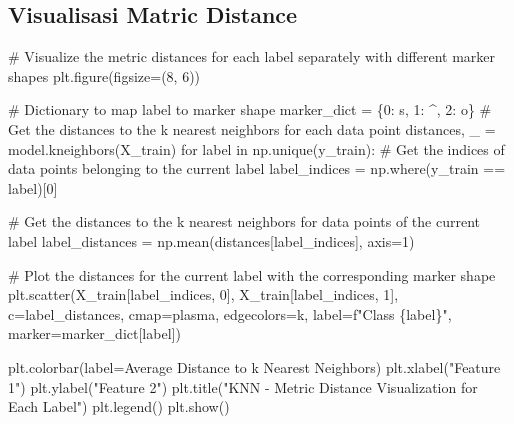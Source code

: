 \documentclass[
  letterpaper,
  DIV=11,
  numbers=noendperiod]{scrreprt}
\newenvironment{Shaded}{\begin{snugshade}}{\end{snugshade}}
\newcommand{\CommentTok}[1]{\textcolor[rgb]{0.37,0.37,0.37}{#1}}
\newcommand{\ControlFlowTok}[1]{\textcolor[rgb]{0.00,0.23,0.31}{#1}}
\newcommand{\DecValTok}[1]{\textcolor[rgb]{0.68,0.00,0.00}{#1}}
\newcommand{\KeywordTok}[1]{\textcolor[rgb]{0.00,0.23,0.31}{#1}}
\newcommand{\NormalTok}[1]{\textcolor[rgb]{0.00,0.23,0.31}{#1}}
\newcommand{\OperatorTok}[1]{\textcolor[rgb]{0.37,0.37,0.37}{#1}}
\newcommand{\SpecialCharTok}[1]{\textcolor[rgb]{0.37,0.37,0.37}{#1}}
\newcommand{\SpecialStringTok}[1]{\textcolor[rgb]{0.13,0.47,0.30}{#1}}
\newcommand{\StringTok}[1]{\textcolor[rgb]{0.13,0.47,0.30}{#1}}
\begin{document}
\hypertarget{visualisasi-matric-distance}{%
\subsection*{Visualisasi Matric
Distance}\label{visualisasi-matric-distance}}

\begin{Shaded}
\begin{Highlighting}[]
\CommentTok{\# Visualize the metric distances for each label separately with different marker shapes}
\NormalTok{plt.figure(figsize}\OperatorTok{=}\NormalTok{(}\DecValTok{8}\NormalTok{, }\DecValTok{6}\NormalTok{))}

\CommentTok{\# Dictionary to map label to marker shape}
\NormalTok{marker\_dict }\OperatorTok{=}\NormalTok{ \{}\DecValTok{0}\NormalTok{: }\StringTok{\textquotesingle{}s\textquotesingle{}}\NormalTok{, }\DecValTok{1}\NormalTok{: }\StringTok{\textquotesingle{}\^{}\textquotesingle{}}\NormalTok{, }\DecValTok{2}\NormalTok{: }\StringTok{\textquotesingle{}o\textquotesingle{}}\NormalTok{\}}
\CommentTok{\# Get the distances to the k nearest neighbors for each data point}
\NormalTok{distances, \_ }\OperatorTok{=}\NormalTok{ model.kneighbors(X\_train)}
\ControlFlowTok{for}\NormalTok{ label }\KeywordTok{in}\NormalTok{ np.unique(y\_train):}
    \CommentTok{\# Get the indices of data points belonging to the current label}
\NormalTok{    label\_indices }\OperatorTok{=}\NormalTok{ np.where(y\_train }\OperatorTok{==}\NormalTok{ label)[}\DecValTok{0}\NormalTok{]}
    
    \CommentTok{\# Get the distances to the k nearest neighbors for data points of the current label}
\NormalTok{    label\_distances }\OperatorTok{=}\NormalTok{ np.mean(distances[label\_indices], axis}\OperatorTok{=}\DecValTok{1}\NormalTok{)}
    
    \CommentTok{\# Plot the distances for the current label with the corresponding marker shape}
\NormalTok{    plt.scatter(X\_train[label\_indices, }\DecValTok{0}\NormalTok{], X\_train[label\_indices, }\DecValTok{1}\NormalTok{], c}\OperatorTok{=}\NormalTok{label\_distances, cmap}\OperatorTok{=}\StringTok{\textquotesingle{}plasma\textquotesingle{}}\NormalTok{, edgecolors}\OperatorTok{=}\StringTok{\textquotesingle{}k\textquotesingle{}}\NormalTok{, label}\OperatorTok{=}\SpecialStringTok{f"Class }\SpecialCharTok{\{}\NormalTok{label}\SpecialCharTok{\}}\SpecialStringTok{"}\NormalTok{, marker}\OperatorTok{=}\NormalTok{marker\_dict[label])}

\NormalTok{plt.colorbar(label}\OperatorTok{=}\StringTok{\textquotesingle{}Average Distance to k Nearest Neighbors\textquotesingle{}}\NormalTok{)}
\NormalTok{plt.xlabel(}\StringTok{"Feature 1"}\NormalTok{)}
\NormalTok{plt.ylabel(}\StringTok{"Feature 2"}\NormalTok{)}
\NormalTok{plt.title(}\StringTok{"KNN {-} Metric Distance Visualization for Each Label"}\NormalTok{)}
\NormalTok{plt.legend()}
\NormalTok{plt.show()}
\end{Highlighting}
\end{Shaded}
\end{document}
